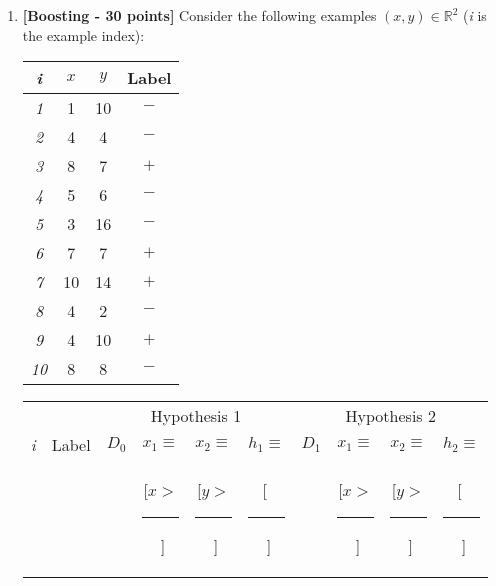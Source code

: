 \begin{enumerate}
\begin{enumerate}
  \end{enumerate}

\item {\bf [Boosting - 30 points]}
  Consider the following examples $(x,y) \in \mathbb{R}^2$ ({\em i} is the example index):
  \begin{center}
    \begin{tabular}{|c|c|c|c|}
      \hline
      {\em i}  & $x$  & $y$ & Label \\
      \hline
      {\em 1}  & 1  & 10 & $-$ \\
      \hline
      {\em 2}  & 4  & 4 & $-$ \\
      \hline
      {\em 3}  & 8  & 7 & $+$ \\
      \hline
      {\em 4}  & 5  & 6 & $-$ \\
      \hline
      {\em 5}  & 3  & 16 & $-$ \\
      \hline
      {\em 6}  & 7  & 7 & $+$ \\
      \hline
      {\em 7}  & 10 & 14 & $+$ \\
      \hline
      {\em 8}  & 4  & 2 & $-$ \\
      \hline
      {\em 9}  & 4  & 10 & $+$ \\
      \hline
      {\em 10} & 8  & 8 & $-$ \\
      \hline
    \end{tabular}
  \end{center}

    \begin{table}[!t]
      {\centering
        \begin{tabular}{|c|c||c|c|c|c||c|c|c|c|}

          \hline
          & & \multicolumn{4}{c||}{Hypothesis 1}
	  & \multicolumn{4}{c|}{Hypothesis 2} \\
          \cline{3-10}
          {\em i} & Label & $D_0$ & $x_1 \equiv $ & $x_2 \equiv $ & $h_1\equiv$ & $D_1$ &  $x_1 \equiv $ & $x_2 \equiv $ & $h_2 \equiv $ \\
          & & & [$x >$\rule[-2pt]{3mm}{0.2pt}$\;$] & [$y >$\rule[-2pt]{3mm}{0.2pt}$\;$] & [$\;$\rule[-2pt]{1cm}{0.2pt}$\;$] & & [$x >$\rule[-2pt]{3mm}{0.2pt}$\;$] & [$y >$\rule[-2pt]{3mm}{0.2pt}$\;$] & [$\;$\rule[-2pt]{1cm}{0.2pt}$\;$] \\


\end{tabular}}
\end{table}
\end{enumerate}
